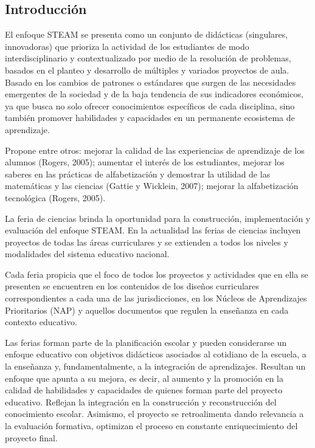 \subsection{Introducción}

El enfoque STEAM se presenta como un conjunto de didácticas (singulares, innovadoras) que prioriza la actividad de los estudiantes de modo interdisciplinario y contextualizado por medio de la resolución de problemas, basados en el planteo y desarrollo de múltiples y variados proyectos de aula. Basado en los cambios de patrones o estándares que surgen de las necesidades emergentes de la sociedad y de la baja tendencia de sus indicadores económicos, ya que busca no solo ofrecer conocimientos específicos de cada disciplina, sino también promover habilidades y capacidades en un permanente ecosistema de aprendizaje.

Propone entre otros: mejorar la calidad de las experiencias de aprendizaje de los alumnos (Rogers, 2005); aumentar el interés de los estudiantes, mejorar los saberes en las prácticas de alfabetización y demostrar la utilidad de las matemáticas y las ciencias (Gattie y Wicklein, 2007); mejorar la alfabetización tecnológica (Rogers, 2005).

La feria de ciencias brinda la oportunidad para la construcción, implementación y evaluación del enfoque STEAM. En la actualidad las ferias de ciencias incluyen proyectos de todas las áreas curriculares y se extienden a todos los niveles y modalidades del sistema educativo nacional.

Cada feria propicia que el foco de todos los proyectos y actividades que en ella se presenten se encuentren en los contenidos de los diseños curriculares correspondientes a cada una de las jurisdicciones, en los Núcleos de Aprendizajes Prioritarios (NAP) y aquellos documentos que regulen la enseñanza en cada contexto educativo.

Las ferias forman parte de la planificación escolar y pueden considerarse un enfoque educativo con objetivos didácticos asociados al cotidiano de la escuela, a la enseñanza y, fundamentalmente, a la integración de aprendizajes. Resultan un enfoque que apunta a su mejora, es decir, al aumento y la promoción en la calidad de habilidades y capacidades de quienes forman parte del proyecto educativo. Reflejan la integración en la construcción y reconstrucción del conocimiento escolar. Asimismo, el proyecto se retroalimenta dando relevancia a la evaluación formativa, optimizan el proceso en constante enriquecimiento del proyecto final.

